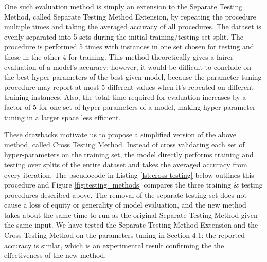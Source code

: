 \documentclass[letterpaper,twocolumn,10pt]{article}
\begin{document}
One such evaluation method is simply an extension to the Separate Testing Method, called Separate Testing Method Extension, by repeating the procedure multiple times and taking the averaged accuracy of all procedures. The dataset is evenly separated into 5 sets during the initial training/testing set split. The procedure is performed 5 times with instances in one set chosen for testing and those in the other 4 for training. This method theoretically gives a fairer evaluation of a model's accuracy; however, it would be difficult to conclude on the best hyper-parameters of the best given model, because the parameter tuning procedure may report at most 5 different values when it's repeated on different training instances. Also, the total time required for evaluation increases by a factor of 5 for one set of hyper-parameters of a model, making hyper-parameter tuning in a larger space less efficient.

These drawbacks motivate us to propose a simplified version of the above method, called Cross Testing Method. Instead of cross validating each set of hyper-parameters on the training set, the model directly performs training and testing over splits of the entire dataset and takes the averaged accuracy from every iteration. The pseudocode in Listing \ref{lst:cross-testing} below outlines this procedure and Figure \ref{fig:testing_methods} compares the three training \& testing procedures described above. The removal of the separate testing set does not cause a loss of equity or generality of model evaluation, and the new method takes about the same time to run as the original Separate Testing Method given the same input. We have tested the Separate Testing Method Extension and the Cross Testing Method on the parameters tuning in Section 4.1: the reported accuracy is simlar, which is an experimental result confirming the the effectiveness of the new method.
\end{document}
